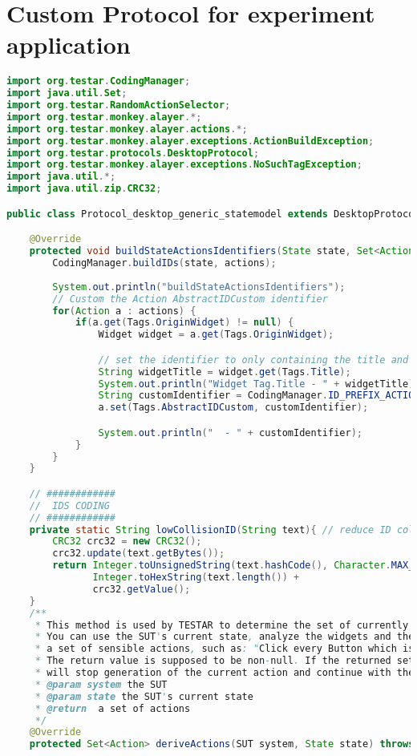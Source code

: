 \chapter{Custom Protocol for experiment application} \label{appendix:protocol-experiment}

\begin{lstlisting}[language=java, basicstyle=\tiny, caption=Protocol for the experiment application, label=code:protocol-experiment]
import org.testar.CodingManager;
import java.util.Set;
import org.testar.RandomActionSelector;
import org.testar.monkey.alayer.*;
import org.testar.monkey.alayer.actions.*;
import org.testar.monkey.alayer.exceptions.ActionBuildException;
import org.testar.protocols.DesktopProtocol;
import org.testar.monkey.alayer.exceptions.NoSuchTagException;
import java.util.*;
import java.util.zip.CRC32;

public class Protocol_desktop_generic_statemodel extends DesktopProtocol {

	@Override
	protected void buildStateActionsIdentifiers(State state, Set<Action> actions) {
		CodingManager.buildIDs(state, actions);
		
		System.out.println("buildStateActionsIdentifiers");
		// Custom the Action AbstractIDCustom identifier
		for(Action a : actions) {
			if(a.get(Tags.OriginWidget) != null) {
				Widget widget = a.get(Tags.OriginWidget);

				// set the identifier to only containing the title and not to include the parent
				String widgetTitle = widget.get(Tags.Title);
				System.out.println("Widget Tag.Title - " + widgetTitle);
				String customIdentifier = CodingManager.ID_PREFIX_ACTION + CodingManager.ID_PREFIX_ABSTRACT_CUSTOM + lowCollisionID(widgetTitle);
				a.set(Tags.AbstractIDCustom, customIdentifier);

				System.out.println("  - " + customIdentifier);
			}
		}
	}

	// ############
	//  IDS CODING
	// ############
	private static String lowCollisionID(String text){ // reduce ID collision probability
		CRC32 crc32 = new CRC32();
		crc32.update(text.getBytes());
		return Integer.toUnsignedString(text.hashCode(), Character.MAX_RADIX) +
			   Integer.toHexString(text.length()) +
			   crc32.getValue();
	}
	/**
	 * This method is used by TESTAR to determine the set of currently available actions.
	 * You can use the SUT's current state, analyze the widgets and their properties to create
	 * a set of sensible actions, such as: "Click every Button which is enabled" etc.
	 * The return value is supposed to be non-null. If the returned set is empty, TESTAR
	 * will stop generation of the current action and continue with the next one.
	 * @param system the SUT
	 * @param state the SUT's current state
	 * @return  a set of actions
	 */
	@Override
	protected Set<Action> deriveActions(SUT system, State state) throws ActionBuildException{


\end{lstlisting}
